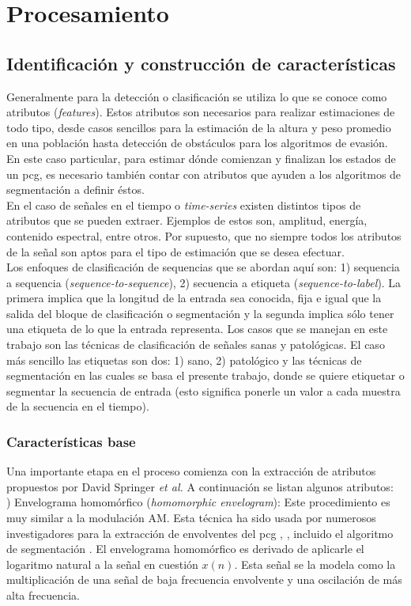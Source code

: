 \chapter{Procesamiento}

\section{Identificación y construcción de características}

\indent Generalmente para la detección o clasificación se utiliza lo que se conoce como atributos
(\textit{features}). Estos atributos son necesarios para realizar estimaciones de todo tipo, desde casos sencillos
para la estimación de la altura y peso promedio en una población hasta detección de obstáculos para los algoritmos
de evasión. En este caso particular, para estimar dónde comienzan y finalizan los estados de un \acrshort{pcg}, es
necesario también contar con atributos que ayuden a los algoritmos de segmentación a definir éstos. \\
\indent En el caso de señales en el tiempo o \textit{time-series} existen distintos tipos de atributos que se pueden
extraer. Ejemplos de estos son, amplitud, energía, contenido espectral, entre otros. Por supuesto, que no siempre
todos los atributos de la señal son aptos para el tipo de estimación que se desea efectuar. \\
\indent Los enfoques de clasificación de sequencias que se abordan aquí son: 1) sequencia a sequencia
(\textit{sequence-to-sequence}), 2) secuencia a etiqueta (\textit{sequence-to-label}). La primera implica que la
longitud de la entrada sea conocida, fija e igual que la salida del bloque de clasificación o segmentación y la
segunda implica sólo tener una etiqueta de lo que la entrada representa. Los casos que se manejan en este trabajo
son las técnicas de clasificación de señales sanas y patológicas. El caso más sencillo las etiquetas son dos: 1)
sano, 2) patológico y las técnicas de segmentación en las cuales se basa el presente trabajo, donde se quiere
etiquetar o segmentar la secuencia de entrada (esto significa ponerle un valor a cada muestra de la secuencia en el
tiempo).

\subsection*{Características base}

\indent Una importante etapa en el proceso comienza con la extracción de atributos propuestos por David Springer
\textit{et al.} \cite{pp:springer2015} A continuación se listan algunos atributos: \\
) Envelograma homomórfico (\textit{homomorphic envelogram}): Este procedimiento es muy similar a la
modulación AM. Esta técnica ha sido usada por numerosos investigadores para la extracción de envolventes del
\acrshort{pcg} \cite{ref:gupta}, \cite{ref:gill-gavrieli-intrator}, incluido el algoritmo de segmentación
\cite{pp:schmidt2010}. El envelograma homomórfico es derivado de aplicarle el logaritmo natural a la señal en
cuestión $x(n)$. Esta señal se la modela como la multiplicación de una señal de baja frecuencia envolvente y una
oscilación de más alta frecuencia.

